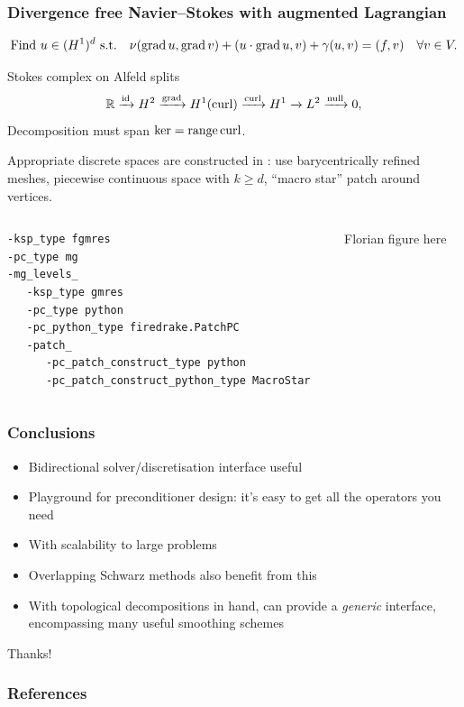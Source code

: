 \documentclass[presentation,aspectratio=43, 10pt]{beamer}
\DeclareMathOperator{\grad}{grad}
\let\div\relax
\DeclareMathOperator{\div}{div}
\DeclareMathOperator{\curl}{curl}
\DeclareMathOperator{\range}{range}
\begin{document}
\begin{frame}[fragile,t]
  \frametitle{Divergence free Navier--Stokes with augmented Lagrangian}
  \vspace{-1.5\baselineskip}
  {\small\begin{equation*}
    \text{Find $u \in (H^1)^d$ s.t.}\quad \nu(\grad u, \grad v) + (u\cdot \grad u, v) + \gamma(\div u, \div v) = (f, v) \quad \forall v \in V.
  \end{equation*}}
  \vspace*{-\baselineskip}
  \begin{block}{Stokes complex on Alfeld splits}
    \begin{equation*}
      \mathbb{R} \xrightarrow{\operatorname{id}} H^2 \xrightarrow{\grad} H^1(\curl)
      \xrightarrow{\curl} H^1 \xrightarrow{\div} L^2 \xrightarrow{\operatorname{null}} 0,
    \end{equation*}
    Decomposition must span $\ker \div = \range \curl$.

    Appropriate discrete spaces are constructed in \textcite{Fu:2018}: use
    barycentrically refined meshes, piecewise continuous space with $k
    \ge d$, ``macro star'' patch around vertices.
  \end{block}
  \begin{columns}
    \begin{column}{0.6\textwidth}
\begin{verbatim}
-ksp_type fgmres
-pc_type mg
-mg_levels_
   -ksp_type gmres
   -pc_type python
   -pc_python_type firedrake.PatchPC
   -patch_
      -pc_patch_construct_type python
      -pc_patch_construct_python_type MacroStar
\end{verbatim}
    \end{column}
    \begin{column}{0.4\textwidth}
      Florian figure here
    \end{column}
  \end{columns}
\end{frame}

\begin{frame}
  \frametitle{Conclusions}
  \begin{itemize}
  \item Bidirectional solver/discretisation interface useful
  \item Playground for preconditioner design: it's easy to get all the
    operators you need
  \item With scalability to large problems
  \item Overlapping Schwarz methods also benefit from this
  \item With topological decompositions in hand, can provide a
    \emph{generic} interface, encompassing many useful smoothing schemes
  \end{itemize}

  \pause

  \begin{center}
    Thanks!
  \end{center}
\end{frame}

\appendix
\begin{frame}[allowframebreaks]
  \frametitle{References}
  \printbibliography[heading=none]
\end{frame}
\end{document}
